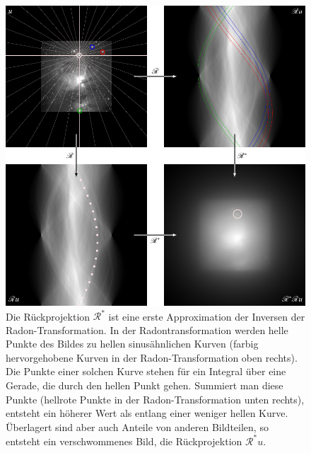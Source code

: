 %
%
%
\begin{figure}
\centering
\includegraphics[width=\textwidth]{chapters/050-radon/images/rueckprojektion.pdf}
\caption{Die Rückprojektion $\mathscr{R}^*$ ist eine erste Approximation
der Inversen der Radon-Transformation.
In der Radontransformation werden helle Punkte des Bildes zu hellen
sinusähnlichen Kurven (farbig hervorgehobene Kurven in der Radon-Transformation
oben rechts).
Die Punkte einer solchen Kurve stehen für ein Integral über eine
Gerade, die durch den hellen Punkt gehen.
Summiert man diese Punkte (hellrote Punkte in der Radon-Transformation
unten rechts), entsteht ein höherer Wert als entlang einer weniger hellen
Kurve.
Überlagert sind aber auch Anteile von anderen Bildteilen, so entsteht
ein verschwommenes Bild, die Rückprojektion $\mathscr{R}^*u$.
\label{buch:radon:rueckprojektion:fig:rueckprojektion}}
\end{figure}
